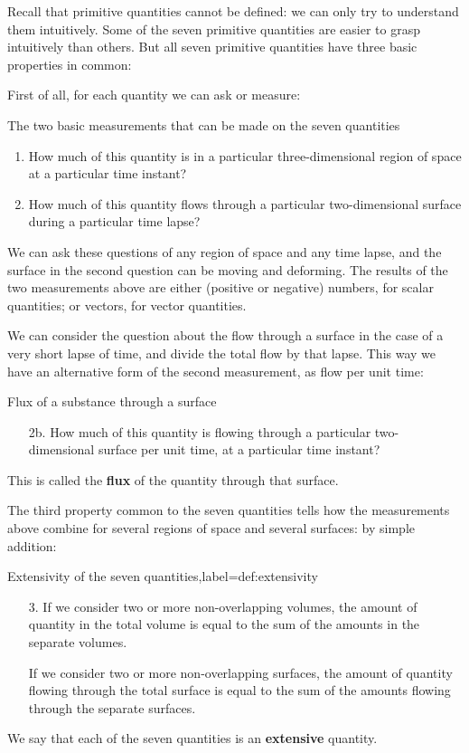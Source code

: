 \documentclass[a4paper,12pt,%
onecolumn,oneside,titlepage,%
british%
]{memoir}
\renewcommand*{\|}[1][]{\nonscript\:#1\vert\nonscript\:\mathopen{}}
\begin{document}
\medskip

Recall that primitive quantities cannot be defined: we can only try to understand them intuitively. Some of the seven primitive quantities are easier to grasp intuitively than others. But all seven primitive quantities have three basic properties in common:

First of all, for each quantity we can ask or measure:
\begin{definition}{The two basic measurements that can be made on the seven quantities}
  \begin{enumerate}[shift,label=\arabic*.]\bfseries
  \item How much of this quantity is in a particular three-dimensional region of space at a particular time instant?

  \item How much of this quantity flows through a particular two-dimensional surface during a particular time lapse?
  \end{enumerate}
\end{definition}
We can ask these questions of any region of space and any time lapse, and the surface in the second question can be moving and deforming. The results of the two measurements above are either (positive or negative) numbers, for scalar quantities; or vectors, for vector quantities.

We can consider the question about the flow through a surface in the case of a very short lapse of time, and divide the total flow by that lapse. This way we have an alternative form of the second measurement, as flow per unit time:
\begin{definition}{Flux of a substance through a surface}
  \begin{enumerate}[shift,label=\arabic*.]\bfseries
  \item[2b.] How much of this quantity is flowing through a particular two-dimensional surface per unit time, at a particular time instant?
  \end{enumerate}
\end{definition}
This is called the \textbf{flux} of the quantity through that surface.

The third property common to the seven quantities tells how the measurements above combine for several regions of space and several surfaces: by simple addition:
\begin{definition}{Extensivity of the seven quantities,label={def:extensivity}}
\begin{enumerate}[shift,label=\arabic*.]\bfseries
  \item[3.]  If we consider two or more non-overlapping volumes, the amount of quantity in the total volume is equal to the sum of the amounts in the separate volumes.

    If we consider two or more non-overlapping surfaces, the amount of quantity flowing through the total surface is equal to the sum of the amounts flowing through the separate surfaces.
  \end{enumerate}
\end{definition}
We say that each of the seven quantities is an \textbf{extensive} quantity.
\end{document}
